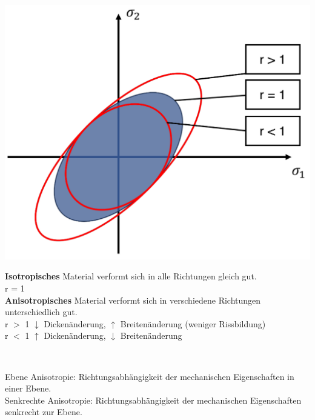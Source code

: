 \begin{minipage}{0.4\linewidth}
    \includegraphics[width = 0.9\linewidth]{src/images/Isotropie.png}
\end{minipage}
\begin{minipage}{0.6\linewidth}
    \textbf{Isotropisches} Material verformt sich in 
    alle Richtungen gleich gut.\\
    r = 1\\

\textbf{Anisotropisches} Material verformt 
sich in verschiedene Richtungen unterschiedlich 
gut.\\
r $>$ 1 $\downarrow$ Dickenänderung, $\uparrow $ Breitenänderung (weniger Rissbildung)\vspace{1mm}\\
r $<$ 1 $\uparrow$ Dickenänderung, $\downarrow$ Breitenänderung
\end{minipage}
\vspace{1mm}\

Ebene Anisotropie:
Richtungsabhängigkeit der mechanischen Eigenschaften in einer Ebene.\\ 

Senkrechte Anisotropie:
Richtungsabhängigkeit der mechanischen Eigenschaften senkrecht zur Ebene.\\